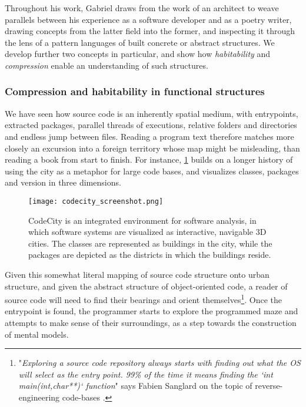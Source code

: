Throughout his work, Gabriel draws from the work of an architect to weave parallels between his experience as a software developer and as a poetry writer, drawing concepts from the latter field into the former, and inspecting it through the lens of a pattern languages of built concrete or abstract structures. We develop further two concepts in particular, and show how \emph{habitability} and \emph{compression} enable an understanding of such structures.

\subsubsection{Compression and habitability in functional structures}
\label{subsubsec:compression-habitability}

We have seen how source code is an inherently spatial medium, with entrypoints, extracted packages, parallel threads of executions, relative folders and directories and endless jump between files. Reading a program text therefore matches more closely an excursion into a foreign territory whose map might be misleading, than reading a book from start to finish. For instance, \ref{graphic:code-city} builds on a longer history of using the city as a metaphor for large code bases, and visualizes classes, packages and version in three dimensions.

\begin{figure}
    \texttt{[image: codecity\_screenshot.png]}
    \caption{CodeCity is an integrated environment for software analysis, in which software systems are visualized as interactive, navigable 3D cities. The classes are represented as buildings in the city, while the packages are depicted as the districts in which the buildings reside. \citep{wettel_codecity_2008}}
    \label{graphic:code-city}
\end{figure}

Given this somewhat literal mapping of source code structure onto urban structure, and given the abstract structure of object-oriented code, a reader of source code will need to find their bearings and orient themselves\footnote{"\emph{Exploring a source code repository always starts with finding out what the OS will select as the entry point. 99\% of the time it means finding the `int main(int,char**)` function}" says Fabien Sanglard on the topic of reverse-engineering code-bases \citep{sanglard_game_2018}.}. Once the entrypoint is found, the programmer starts to explore the programmed maze and attempts to make sense of their surroundings, as a step towards the construction of mental models.

